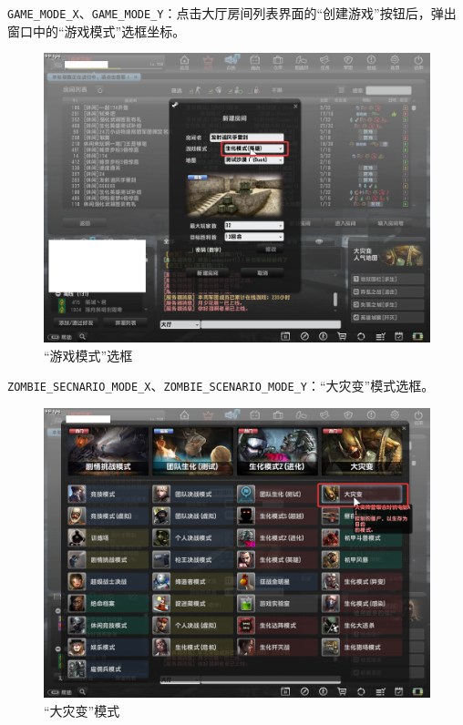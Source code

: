 \lstinline{GAME_MODE_X}、\lstinline{GAME_MODE_Y}：点击大厅房间列表界面的“创建游戏”按钮后，弹出窗口中的“游戏模式”选框坐标。

\begin{figure}[H]
    \Centering
    \includegraphics[width=\textwidth]{docs/assets/game_mode.png}
    \caption{“游戏模式”选框}
\end{figure}

\lstinline{ZOMBIE_SECNARIO_MODE_X}、\lstinline{ZOMBIE_SCENARIO_MODE_Y}：“大灾变”模式选框。

\begin{figure}[H]
    \Centering
    \includegraphics[width=\textwidth]{docs/assets/zombie_scenario.png}
    \caption{“大灾变”模式}
\end{figure}

